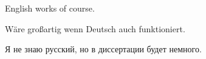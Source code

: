 \Abstract{}
English works of course.

Wäre großartig wenn Deutsch auch funktioniert.


\foreignlanguage{russian}{Я не знаю русский, но в диссертации будет немного.}
